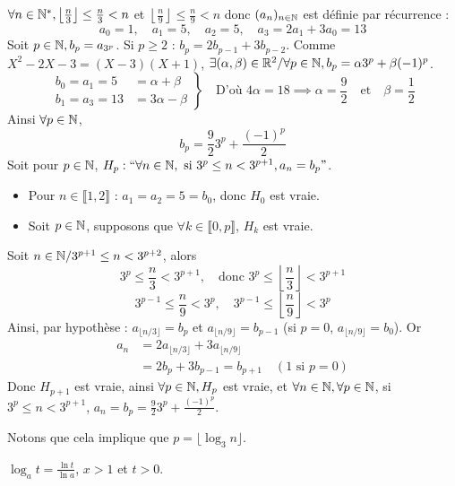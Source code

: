 \begin{solution}
$\forall n \in \mathbb N^*, \left\lfloor \frac{n}{3} \right\rfloor \leq \frac{n}{3} < n$ et $\left\lfloor \frac{n}{9} \right\rfloor \leq \frac{n}{9} < n$ donc $(a_n)_{n \in \mathbb N}$ est définie par récurrence :
\[
a_0 = 1, \quad a_1 = 5, \quad a_2 = 5, \quad a_3 = 2a_1 + 3a_0 = 13
\]
Soit $p \in \mathbb N, b_p = a_{3^p}$. Si $p \geq 2$ : $b_p = 2b_{p-1} + 3b_{p-2}$.
Comme $X^2 - 2X - 3 = (X - 3)(X + 1)$, $\exists (\alpha, \beta) \in \mathbb R^2 / \forall p \in \mathbb N, b_p = \alpha 3^p + \beta (-1)^p$.
\[
\left. \begin{aligned}
b_0 = a_1 = 5 &= \alpha + \beta \\
b_1 = a_3 = 13 &= 3\alpha - \beta
\end{aligned} \right\}
\quad \text{D'où } 4\alpha = 18 \implies \alpha = \frac{9}{2} \quad \text{et} \quad \beta = \frac{1}{2}
\]
Ainsi $\forall p \in \mathbb N$,
\[
b_p = \frac{9}{2} 3^p + \frac{(-1)^p}{2}
\]
Soit pour $p \in \mathbb N$, $H_p : \text{“} \forall n \in \mathbb N, \text{ si } 3^p \leq n < 3^{p+1}, a_n = b_p \text{”}$.
\begin{itemize}
  \item Pour $n \in \llbracket 1, 2 \rrbracket$ : $a_1 = a_2 = 5 = b_0$, donc $H_0$ est vraie.
  \item Soit $p \in \mathbb N$, supposons que $\forall k \in \llbracket 0, p \rrbracket$, $H_k$ est vraie.
\end{itemize}
Soit $n \in \mathbb N / 3^{p+1} \leq n < 3^{p+2}$, alors
\[
3^p \leq \frac{n}{3} < 3^{p+1}, \quad \text{donc } 3^p \leq \left\lfloor \frac{n}{3} \right\rfloor < 3^{p+1}
\]
\[
3^{p-1} \leq \frac{n}{9} < 3^p, \quad 3^{p-1} \leq \left\lfloor \frac{n}{9} \right\rfloor < 3^p
\]
Ainsi, par hypothèse : $a_{\lfloor n/3 \rfloor} = b_p$ et $a_{\lfloor n/9 \rfloor} = b_{p-1}$ (si $p=0$, $a_{\lfloor n/9 \rfloor} = b_0$).
Or
\begin{align*}
a_n &= 2 a_{\lfloor n/3 \rfloor} + 3 a_{\lfloor n/9 \rfloor} \\
&= 2b_p + 3b_{p-1} = b_{p+1} \quad (\text{1 si } p=0)
\end{align*}
Donc $H_{p+1}$ est vraie, ainsi $\forall p \in \mathbb N, H_p$ est vraie, et $\forall n \in \mathbb N, \forall p \in \mathbb N$, si $3^p \leq n < 3^{p+1}$, $a_n = b_p = \frac{9}{2} 3^p + \frac{(-1)^p}{2}$.

Notons que cela implique que $p = \lfloor \log_3 n \rfloor$.
\begin{remarkbox}
$\log_a t = \frac{\ln t}{\ln a}$, $x > 1$ et $t > 0$.
\end{remarkbox}


\end{solution}
